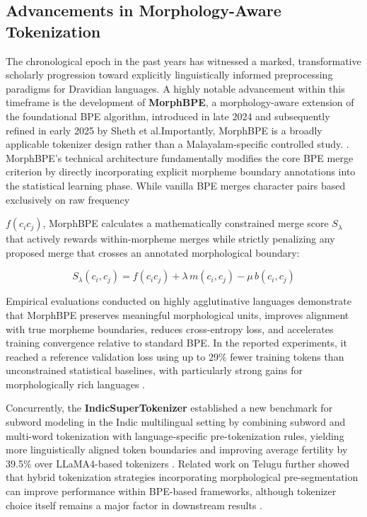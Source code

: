 \documentclass[12pt]{article}
\begin{document}
\subsection{Advancements in Morphology-Aware Tokenization}

The chronological epoch in the past years has witnessed a marked, transformative scholarly progression toward explicitly linguistically informed preprocessing paradigms for Dravidian languages. A highly notable advancement within this timeframe is the development of \textbf{MorphBPE}\cite{asgari2025morphbpe}, a morphology-aware extension of the foundational BPE algorithm, introduced in late 2024 and subsequently refined in early 2025 by Sheth et al.Importantly, MorphBPE is a broadly applicable tokenizer design rather than a Malayalam-specific controlled study. . MorphBPE's technical architecture fundamentally modifies the core BPE merge criterion by directly incorporating explicit morpheme boundary annotations into the statistical learning phase. While vanilla BPE merges character pairs based exclusively on raw frequency 

$f(c_i c_j)$, MorphBPE calculates a mathematically constrained merge score 
$S_{\lambda}$ that actively rewards within-morpheme merges while strictly 
penalizing any proposed merge that crosses an annotated morphological boundary:

\begin{equation}
S_{\lambda}(c_i, c_j) = f(c_i c_j) + \lambda\, m(c_i, c_j) - \mu\, b(c_i, c_j)
\end{equation}
 
Empirical evaluations conducted on highly agglutinative languages demonstrate that MorphBPE preserves meaningful morphological units, improves alignment with true morpheme boundaries, reduces cross-entropy loss, and accelerates training convergence relative to standard BPE. In the reported experiments, it reached a reference validation loss using up to 29\% fewer training tokens than unconstrained statistical baselines, with particularly strong gains for morphologically rich languages \cite{asgari2025morphbpe}. 

Concurrently, the \textbf{IndicSuperTokenizer} established a new benchmark for subword modeling in the Indic multilingual setting by combining subword and multi-word tokenization with language-specific pre-tokenization rules, yielding more linguistically aligned token boundaries and improving average fertility by 39.5\% over LLaMA4-based tokenizers \cite{rana2025indicsupertokenizer}. Related work on Telugu further showed that hybrid tokenization strategies incorporating morphological pre-segmentation can improve performance within BPE-based frameworks, although tokenizer choice itself remains a major factor in downstream results \cite{vemula2025rethinking}. 
\end{document}
